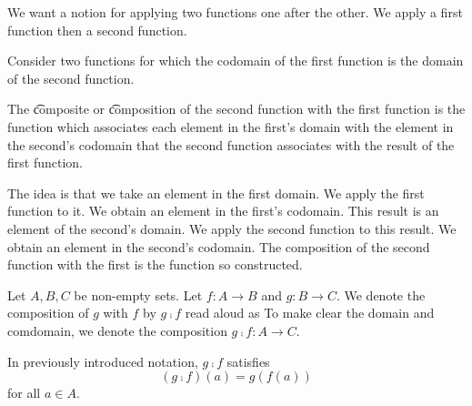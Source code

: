 

We want a notion
for applying
two functions
one after the other.
We apply a first function
then a second function.


Consider
two functions
for which the codomain
of the first function
is the domain of the
second function.

The
\t{composite} or \t{composition}
of the second function with
the first function
is the function which
associates each element
in the first's domain
with the element in
the second's codomain
that the second function
associates with the
result of the first function.

The idea is that we take
an element in the first
domain.
We apply the first function
to it.
We obtain an element in the
first's codomain.
This result is an element of
the second's domain.
We apply the second function
to this result.
We obtain an element
in the second's codomain.
The composition of the second
function with the first
is the function so constructed.


Let $A, B, C$ be
non-empty sets.
Let $f: A \to B$
and $g: B \to C$.
We denote the
composition
of $g$ with $f$
by
$g \comp f$
read aloud as
To make clear the domain
and comdomain, we denote
the composition
$g \comp f: A \to C$.

In previously introduced
notation,
$g \comp f$
satisfies
\[
  (g \comp f)(a) = g(f(a))
\]
for all $a \in A$.

